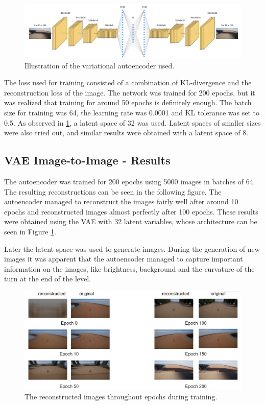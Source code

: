 \documentclass[conference]{IEEEtran}
\begin{document}
\begin{figure}[!t]
  \centering
  \includegraphics[width=1.0\linewidth]{images/Our-VAE.png}
  \caption{Illustration of the variational autoencoder used.
}
\label{fig:our-variational-autoencoder}
\end{figure}

The loss used for training consisted of a combination of KL-divergence and the reconstruction loss of the image. The network was trained for 200 epochs, but it was realized that training for around 50 epochs is definitely enough. The batch size for training was 64, the learning rate was 0.0001 and KL tolerance was set to 0.5. As observed in \figurename  \ref{fig:our-variational-autoencoder}, a latent space of 32 was used. Latent spaces of smaller sizes were also tried out, and similar results were obtained with a latent space of 8. 

\subsection{VAE Image-to-Image - Results}
The autoencoder was trained for 200 epochs using 5000 images in batches of 64. The resulting reconstructions can be seen in the following figure. The autoencoder managed to reconstruct the images fairly well after around 10 epochs and reconstructed images almost perfectly after 100 epochs. These results were obtained using the VAE with 32 latent variables, whose architecture can be seen in Figure \ref{fig:our-variational-autoencoder}. 

Later the latent space was used to generate images. During the generation of new images it was apparent that the autoencoder managed to capture important information on the images, like brightness, background and the curvature of the turn at the end of the level. 

\begin{figure}[h]
  \centering
  \includegraphics[width=1.0\linewidth]{images/VAE-results.png}
  \caption{The reconstructed images throughout epochs during training.
}
\label{fig:vae-epochs}
\end{figure}
\end{document}

